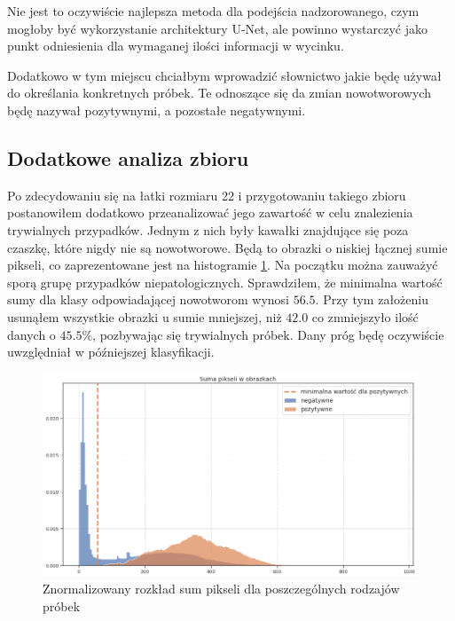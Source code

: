 Nie jest to oczywiście najlepsza metoda dla podejścia nadzorowanego, czym mogłoby być wykorzystanie architektury U-Net, ale powinno wystarczyć jako punkt odniesienia dla wymaganej ilości informacji w wycinku.

Dodatkowo w tym miejscu chciałbym wprowadzić słownictwo jakie będę używał do określania konkretnych próbek. Te odnoszące się da zmian nowotworowych będę nazywał pozytywnymi, a pozostałe negatywnymi.

\subsection{Dodatkowe analiza zbioru}

Po zdecydowaniu się na łatki rozmiaru 22 i przygotowaniu takiego zbioru postanowiłem dodatkowo przeanalizować jego zawartość w celu znalezienia trywialnych przypadków. Jednym z nich były kawałki znajdujące się poza czaszkę, które nigdy nie są nowotworowe. Będą to obrazki o niskiej łącznej sumie pikseli, co zaprezentowane jest na histogramie \ref{fig:pixel_sums}. Na początku można zauważyć sporą grupę przypadków niepatologicznych. Sprawdziłem, że minimalna wartość sumy dla klasy odpowiadającej nowotworom wynosi $56.5$. Przy tym założeniu usunąłem wszystkie obrazki u sumie mniejszej, niż $42.0$ co zmniejszyło ilość danych o $45.5\%$, pozbywając się trywialnych próbek. Dany próg będę oczywiście uwzględniał w późniejszej klasyfikacji.

\begin{figure}[h!]
    \centering
    \includegraphics[width=1.0\textwidth]{images/pixel_sums_v3}
    \caption{Znormalizowany rozkład sum pikseli dla poszczególnych rodzajów próbek}
    \label{fig:pixel_sums}
\end{figure}
